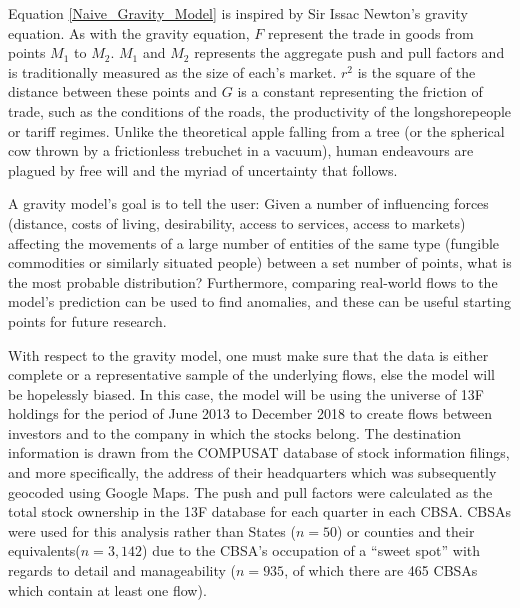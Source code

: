 Equation \ref{Naive_Gravity_Model} is inspired by Sir Issac Newton's gravity equation.  As with the gravity equation, $F$ represent the trade in goods from points $M_{1}$ to $M_{2}$. $M_{1}$ and $M_{2}$ represents the aggregate push and pull factors and is traditionally measured as the size of each's market. $r^{2}$ is the square of the distance between these points and $G$ is a constant representing the friction of trade, such as the conditions of the roads, the productivity of the longshorepeople or tariff regimes.  Unlike the theoretical apple falling from a tree (or the spherical cow thrown by a frictionless trebuchet in a vacuum), human endeavours are plagued by free will and the myriad of uncertainty that follows.  

A gravity model's goal is to tell the user: Given a number of influencing forces (distance, costs of living, desirability, access to services, access to markets) affecting the movements of a large number of entities of the same type (fungible commodities or similarly situated people) between a set number of points, what is the most probable distribution?  Furthermore, comparing real-world flows to the model's prediction can be used to find anomalies, and these can be useful starting points for future research\citep{Crymble19}.  

With respect to the gravity model, one must make sure that the data is either complete or a representative sample of the underlying flows, else the model will be hopelessly biased.  In this case, the model will be using the universe of 13F holdings for the period of June 2013 to December 2018 to create flows between investors and to the company in which the stocks belong.  The destination information is drawn from the COMPUSAT database \citep{Compustat} of stock information filings, and more specifically, the address of their headquarters which was subsequently geocoded using Google Maps.  The push and pull factors were calculated as the total stock ownership in the 13F database for each quarter in each CBSA.  CBSAs were used for this analysis rather than States ($n=50$) or counties and their equivalents($n=3,142$) due to the CBSA's occupation of a ``sweet spot'' with regards to detail and manageability  ($n= 935$, of which there are 465 CBSAs which contain at least one flow).  


